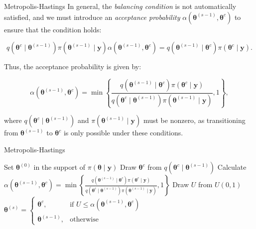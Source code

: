 \documentclass[12pt, compress]{beamer}
\begin{document}
\begin{frame}{Metropolis-Hastings}
In general, the \textit{balancing condition} is not automatically satisfied, and we must introduce an \textit{acceptance probability} $\alpha(\boldsymbol{\theta}^{(s-1)}, \boldsymbol{\theta}^{c})$ to ensure that the condition holds:

\[
q(\boldsymbol{\theta}^{c} \mid  \boldsymbol{\theta}^{(s-1)}) \pi(\boldsymbol{\theta}^{(s-1)} \mid  \mathbf{y}) \alpha(\boldsymbol{\theta}^{(s-1)}, \boldsymbol{\theta}^{c}) = q(\boldsymbol{\theta}^{(s-1)} \mid  \boldsymbol{\theta}^{c}) \pi(\boldsymbol{\theta}^{c} \mid  \mathbf{y}).
\]

Thus, the acceptance probability is given by:

\[
\alpha(\boldsymbol{\theta}^{(s-1)}, \boldsymbol{\theta}^{c}) = 
\min\left\{\frac{q(\boldsymbol{\theta}^{(s-1)} \mid  \boldsymbol{\theta}^{c}) \pi(\boldsymbol{\theta}^{c} \mid  \mathbf{y})}{q(\boldsymbol{\theta}^{c} \mid  \boldsymbol{\theta}^{(s-1)}) \pi(\boldsymbol{\theta}^{(s-1)} \mid  \mathbf{y})}, 1\right\},
\]

where $q(\boldsymbol{\theta}^{c} \mid  \boldsymbol{\theta}^{(s-1)})$ and $\pi(\boldsymbol{\theta}^{(s-1)} \mid  \mathbf{y})$ must be nonzero, as transitioning from $\boldsymbol{\theta}^{(s-1)}$ to $\boldsymbol{\theta}^{c}$ is only possible under these conditions.
\end{frame}
	
\begin{frame}{Metropolis-Hastings}
	\begin{algorithm}[H]
		\caption{Metropolis-Hastings algorithm}\label{Alg:MH}
		\begin{algorithmic}[1]
			\State Set $\bm{\theta}^{(0)}$ in the support of $\pi(\bm{\theta}\mid \bm{y})$
			\State Draw $\bm{\theta}^{c}$ from $q(\bm{\theta}^{c}\mid \bm{\theta}^{(s-1)})$
			\State Calculate $\alpha(\bm{\theta}^{(s-1)}, \bm{\theta}^{c}) = 
			\min\left\{\frac{q(\bm{\theta}^{(s-1)} \mid  \bm{\theta}^{c}) \pi(\bm{\theta}^{c} \mid  \bm{y})}{q(\bm{\theta}^{c} \mid  \bm{\theta}^{(s-1)}) \pi(\bm{\theta}^{(s-1)} \mid  \bm{y})}, 1\right\}$
			\State Draw $U$ from $U(0,1)$
			\State $\bm{\theta}^{(s)}=
			\begin{cases}
				\bm{\theta}^{c}, & \text{if } U \leq \alpha(\bm{\theta}^{(s-1)}, \bm{\theta}^{c}) \\
				\bm{\theta}^{(s-1)}, & \text{otherwise}
			\end{cases}$
			\EndFor 
		\end{algorithmic}
	\end{algorithm}
\end{frame}
\end{document}
